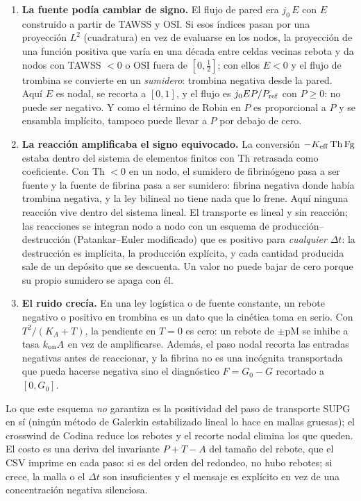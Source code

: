 \documentclass[11pt,a4paper]{article}
\newcommand{\Pref}{P_{\rm ref}}
\begin{document}
\begin{enumerate}[leftmargin=1.6em]
\item \textbf{La fuente podía cambiar de signo.} El flujo de pared era $j_0\,E$ con $E$ construido a partir de TAWSS y OSI. Si esos índices pasan por una proyección $L^2$ (cuadratura) en vez de evaluarse en los nodos, la proyección de una función positiva que varía en una década entre celdas vecinas rebota y da nodos con TAWSS $<0$ o OSI fuera de $[0,\tfrac12]$; con ellos $E<0$ y el flujo de trombina se convierte en un \emph{sumidero}: trombina negativa desde la pared. Aquí $E$ es nodal, se recorta a $[0,1]$, y el flujo es $j_0EP/\Pref$ con $P\ge0$: no puede ser negativo. Y como el término de Robin en $P$ es proporcional a $P$ y se ensambla implícito, tampoco puede llevar a $P$ por debajo de cero.
\item \textbf{La reacción amplificaba el signo equivocado.} La conversión $-K_{\rm eff}\,\mathrm{Th}\,\mathrm{Fg}$ estaba dentro del sistema de elementos finitos con Th retrasada como coeficiente. Con Th $<0$ en un nodo, el sumidero de fibrinógeno pasa a ser fuente y la fuente de fibrina pasa a ser sumidero: fibrina negativa donde había trombina negativa, y la ley bilineal no tiene nada que lo frene. Aquí ninguna reacción vive dentro del sistema lineal. El transporte es lineal y sin reacción; las reacciones se integran nodo a nodo con un esquema de producción--destrucción (Patankar--Euler modificado) que es positivo para \emph{cualquier} $\Delta t$: la destrucción es implícita, la producción explícita, y cada cantidad producida sale de un depósito que se descuenta. Un valor no puede bajar de cero porque su propio sumidero se apaga con él.
\item \textbf{El ruido crecía.} En una ley logística o de fuente constante, un rebote negativo o positivo en trombina es un dato que la cinética toma en serio. Con $T^2/(K_A+T)$, la pendiente en $T=0$ es cero: un rebote de $\pm$pM se inhibe a tasa $k_{\rm on}A$ en vez de amplificarse. Además, el paso nodal recorta las entradas negativas antes de reaccionar, y la fibrina no es una incógnita transportada que pueda hacerse negativa sino el diagnóstico $F=G_0-G$ recortado a $[0,G_0]$.
\end{enumerate}

Lo que este esquema \emph{no} garantiza es la positividad del paso de transporte SUPG en sí (ningún método de Galerkin estabilizado lineal lo hace en mallas gruesas); el crosswind de Codina reduce los rebotes y el recorte nodal elimina los que queden. El costo es una deriva del invariante $P+T-A$ del tamaño del rebote, que el CSV imprime en cada paso: si es del orden del redondeo, no hubo rebotes; si crece, la malla o el $\Delta t$ son insuficientes y el mensaje es explícito en vez de una concentración negativa silenciosa.
\end{document}
